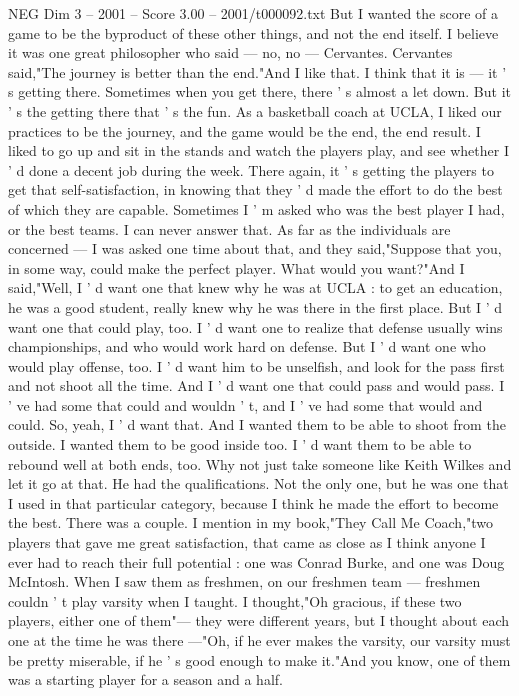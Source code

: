 \begin{textsample}{NEG Dim 3 – 2001 – Score 3.00 – 2001/t000092.txt}
But I wanted the score of a game to be the byproduct of these other things, and not the end itself.
I believe it was one great philosopher who said — no, no — Cervantes.
Cervantes said,"The journey is better than the end."And I like that.
I think that it is — it ' s getting there.
Sometimes when you get there, there ' s almost a let down.
But it ' s the getting there that ' s the fun.
As a basketball coach at UCLA, I liked our practices to be the journey, and the game would be the end, the end result.
I liked to go up and sit in the stands and watch the players play, and see whether I ' d done a decent job during the week.
There again, it ' s getting the players to get that self-satisfaction, in knowing that they ' d made the effort to do the best of which they are capable.
Sometimes I ' m asked who was the best player I had, or the best teams.
I can never answer that.
As far as the individuals are concerned — I was asked one time about that, and they said,"Suppose that you, in some way, could make the perfect player.
What would you want?"And I said,"Well, I ' d want one that knew why he was at UCLA : to get an education, he was a good student, really knew why he was there in the first place.
But I ' d want one that could play, too.
I ' d want one to realize that defense usually wins championships, and who would work hard on defense.
But I ' d want one who would play offense, too.
I ' d want him to be unselfish, and look for the pass first and not shoot all the time.
And I ' d want one that could pass and would pass.
I ' ve had some that could and wouldn ' t, and I ' ve had some that would and could.
So, yeah, I ' d want that.
And I wanted them to be able to shoot from the outside.
I wanted them to be good inside too.
I ' d want them to be able to rebound well at both ends, too.
Why not just take someone like Keith Wilkes and let it go at that.
He had the qualifications.
Not the only one, but he was one that I used in that particular category, because I think he made the effort to become the best.
There was a couple.
I mention in my book,"They Call Me Coach,"two players that gave me great satisfaction, that came as close as I think anyone I ever had to reach their full potential : one was Conrad Burke, and one was Doug McIntosh.
When I saw them as freshmen, on our freshmen team — freshmen couldn ' t play varsity when I taught.
I thought,"Oh gracious, if these two players, either one of them"— they were different years, but I thought about each one at the time he was there —"Oh, if he ever makes the varsity, our varsity must be pretty miserable, if he ' s good enough to make it."And you know, one of them was a starting player for a season and a half.

\end{textsample}
